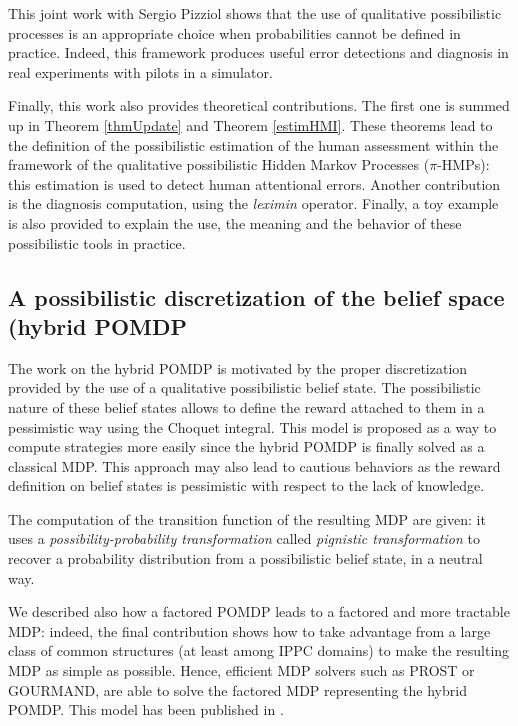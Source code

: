 This joint work with Sergio Pizziol 
shows that the use of qualitative possibilistic processes
is an appropriate choice
when probabilities 
cannot be defined in practice.
Indeed, this framework produces
useful error detections and diagnosis
in real experiments 
with pilots in a simulator.

Finally, this work also provides 
theoretical contributions.
The first one is
summed up in Theorem \ref{thmUpdate} 
and Theorem \ref{estimHMI}.
These theorems lead to the definition
of the possibilistic estimation 
of the human assessment
within the framework of the qualitative possibilistic 
Hidden Markov Processes ($\pi$-HMPs):
this estimation is used to detect human attentional errors.
Another contribution 
is the diagnosis computation,
using the \textit{leximin} operator.
Finally, a toy example is also provided
to explain the use, the meaning and the behavior 
of these possibilistic tools in practice.

\subsection*{A possibilistic discretization of the belief space (hybrid POMDP}
The work on the hybrid POMDP is motivated 
by the proper discretization 
provided by the use 
of a qualitative possibilistic belief state.
The possibilistic nature of these belief states 
allows to define the reward attached to them 
in a pessimistic way using the Choquet integral.
This model is proposed as a way to compute
strategies more easily since the hybrid POMDP
is finally solved as a classical MDP.
This approach may also lead to cautious behaviors
as the reward definition on belief states is pessimistic
with respect to the lack of knowledge.

The computation of the transition function of the resulting MDP
are given: it uses a \textit{possibility-probability transformation}
called \textit{pignistic transformation} 
to recover a probability distribution 
from a possibilistic belief state, in a neutral way.

We described also how a factored POMDP 
leads to a factored and more tractable MDP:
indeed, the final contribution shows how to take advantage from 
a large class of common structures (at least among IPPC domains)
to make the resulting MDP as simple as possible.
Hence, efficient MDP solvers such as PROST or GOURMAND, 
are able to solve the factored MDP 
representing the hybrid POMDP.
This model has been published in \cite{DBLP:conf/sum/DrougardDFT15}.

